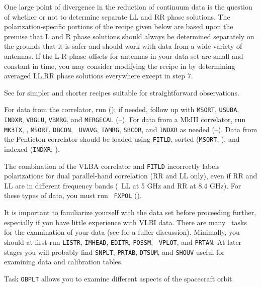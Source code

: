 One large point of divergence in the reduction of continuum
  data is the question of whether or not
to determine separate LL and RR phase solutions.  The
polarization-specific portions of the recipe given below are based
upon the premise that L and R phase solutions should always be
determined separately on the grounds that it is safer and should work
with data from a wide variety of antennas.  If the L-R phase offsets
for antennas in your data set are small and constant in time, you may
consider modifying the recipe in  by determining
averaged LL,RR phase solutions everywhere except in step 7.


See  for simpler and shorter recipes suitable for
straightforward observations.

\xbit
{}
For data from the  correlator, run {\tt {}}
(); if needed, follow up with {\tt MSORT}, {\tt USUBA},
{\tt INDXR}, {\tt VBGLU}, {\tt VBMRG}, and {\tt MERGECAL}
(--).  For data from a MkIII correlator,
run {\tt MK3TX}, {\tt {}}, {\tt MSORT}, {\tt DBCON}, {\tt
UVAVG}, {\tt TAMRG}, {\tt SBCOR}, and {\tt INDXR} as needed
(--).  Data from the Penticton correlator
should be loaded using {\tt FITLD}, sorted ({\tt MSORT},
), and indexed ({\tt INDXR}, ).

The combination of the VLBA correlator and {\tt FITLD} incorrectly
labels polarizations for dual parallel-hand correlation (RR and LL
only), even if RR and LL are in different frequency bands (\eg\ LL at
5 GHz and RR at 8.4 GHz).  For these types of data, you must run {\tt
FXPOL} ().

It is important to familiarize yourself with the data set before
proceeding further, especially if you have little experience with VLBI
data. There are many \AIPS\ tasks for the examination of your data
(see  for a fuller discussion).  Minimally, you should at
first run {\tt LISTR}, {\tt IMHEAD}, {\tt EDITR}, {\tt POSSM}, {\tt
VPLOT}, and {\tt PRTAN}\@.  At later stages you will probably find
{\tt SNPLT}, {\tt PRTAB}, {\tt DTSUM}, and {\tt SHOUV} useful for
examining data and calibration tables.

Task {\tt OBPLT} allows you to examine different aspects of the
spacecraft orbit.

